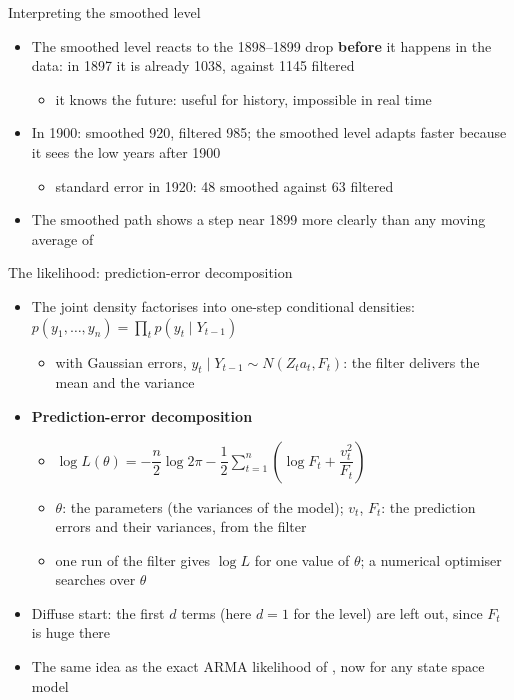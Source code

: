 \begin{frame}{Interpreting the smoothed level}
\itemsize{\small}
\begin{itemize}
    \item The smoothed level reacts to the 1898--1899 drop \textbf{before} it happens in the data: in 1897 it is already 1038, against 1145 filtered
    \begin{itemize}
        \item it knows the future: useful for history, impossible in real time
    \end{itemize}
    \item In 1900: smoothed 920, filtered 985; the smoothed level adapts faster because it sees the low years after 1900
    \begin{itemize}
        \item standard error in 1920: 48 smoothed against 63 filtered
    \end{itemize}
    \item The smoothed path shows a step near 1899 more clearly than any moving average of 
\end{itemize}
\end{frame}

\begin{frame}{The likelihood: prediction-error decomposition}
\itemsize{\small}
\begin{itemize}
    \item The joint density factorises into one-step conditional densities: $p(y_1, \dots, y_n) = \prod_t p(y_t \mid Y_{t-1})$
    \begin{itemize}
        \item with Gaussian errors, $y_t \mid Y_{t-1} \sim N(Z_ta_t, F_t)$: the filter delivers the mean and the variance
    \end{itemize}
    \item \textbf{Prediction-error decomposition}
    \begin{itemize}
        \item $\log L(\theta) = -\dfrac{n}{2}\log 2\pi - \dfrac12\sum_{t=1}^{n}\left(\log F_t + \dfrac{v_t^2}{F_t}\right)$
        \item $\theta$: the parameters (the variances of the model); $v_t$, $F_t$: the prediction errors and their variances, from the filter
        \item one run of the filter gives $\log L$ for one value of $\theta$; a numerical optimiser searches over $\theta$
    \end{itemize}
    \item Diffuse start: the first $d$ terms (here $d = 1$ for the level) are left out, since $F_t$ is huge there 
    \item The same idea as the exact ARMA likelihood of , now for any state space model
\end{itemize}
\end{frame}

